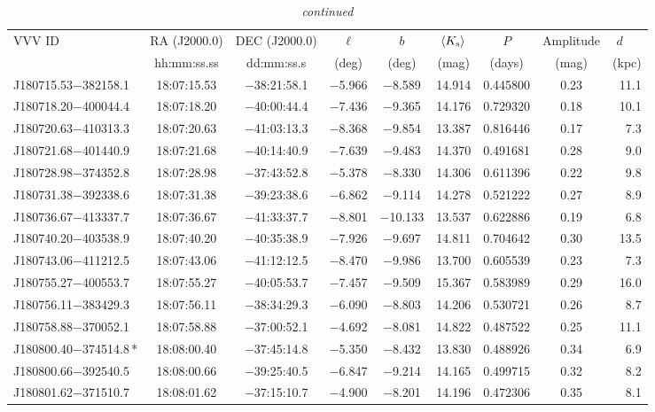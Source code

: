 \begin{table*}
\centering
\caption[]{{\it continued}}
\begin{tabular}{lcccccccr}
\hline \hline
VVV ID & RA (J2000.0)  & DEC (J2000.0) & $\ell$ & $b$ &  $\langle K_{\rm s} \rangle$ & $P$ & Amplitude & $d$~~~ \\
     & hh:mm:ss.ss    & dd:mm:ss.s   &  (deg) & (deg) &   (mag)       & (days) & (mag) & (kpc)   \\
\hline
J180715.53$-$382158.1 & 18:07:15.53 & $-$38:21:58.1 & $-$5.966 & $-$8.589 & 14.914 & 0.445800 & 0.23 & 11.1 \\
J180718.20$-$400044.4 & 18:07:18.20 & $-$40:00:44.4 & $-$7.436 & $-$9.365 & 14.176 & 0.729320 & 0.18 & 10.1 \\
J180720.63$-$410313.3 & 18:07:20.63 & $-$41:03:13.3 & $-$8.368 & $-$9.854 & 13.387 & 0.816446 & 0.17 & 7.3 \\
J180721.68$-$401440.9 & 18:07:21.68 & $-$40:14:40.9 & $-$7.639 & $-$9.483 & 14.370 & 0.491681 & 0.28 & 9.0 \\
J180728.98$-$374352.8 & 18:07:28.98 & $-$37:43:52.8 & $-$5.378 & $-$8.330 & 14.306 & 0.611396 & 0.22 & 9.8 \\
J180731.38$-$392338.6 & 18:07:31.38 & $-$39:23:38.6 & $-$6.862 & $-$9.114 & 14.278 & 0.521222 & 0.27 & 8.9 \\
J180736.67$-$413337.7 & 18:07:36.67 & $-$41:33:37.7 & $-$8.801 & $-$10.133 & 13.537 & 0.622886 & 0.19 & 6.8 \\
J180740.20$-$403538.9 & 18:07:40.20 & $-$40:35:38.9 & $-$7.926 & $-$9.697 & 14.811 & 0.704642 & 0.30 & 13.5 \\
J180743.06$-$411212.5 & 18:07:43.06 & $-$41:12:12.5 & $-$8.470 & $-$9.986 & 13.700 & 0.605539 & 0.23 & 7.3 \\
J180755.27$-$400553.7 & 18:07:55.27 & $-$40:05:53.7 & $-$7.457 & $-$9.509 & 15.367 & 0.583989 & 0.29 & 16.0 \\
J180756.11$-$383429.3 & 18:07:56.11 & $-$38:34:29.3 & $-$6.090 & $-$8.803 & 14.206 & 0.530721 & 0.26 & 8.7 \\
J180758.88$-$370052.1 & 18:07:58.88 & $-$37:00:52.1 & $-$4.692 & $-$8.081 & 14.822 & 0.487522 & 0.25 & 11.1 \\
J180800.40$-$374514.8\,* & 18:08:00.40 & $-$37:45:14.8 & $-$5.350 & $-$8.432 & 13.830 & 0.488926 & 0.34 & 6.9 \\
J180800.66$-$392540.5 & 18:08:00.66 & $-$39:25:40.5 & $-$6.847 & $-$9.214 & 14.165 & 0.499715 & 0.32 & 8.2 \\
J180801.62$-$371510.7 & 18:08:01.62 & $-$37:15:10.7 & $-$4.900 & $-$8.201 & 14.196 & 0.472306 & 0.35 & 8.1 \\

\end{tabular}
\end{table*}
